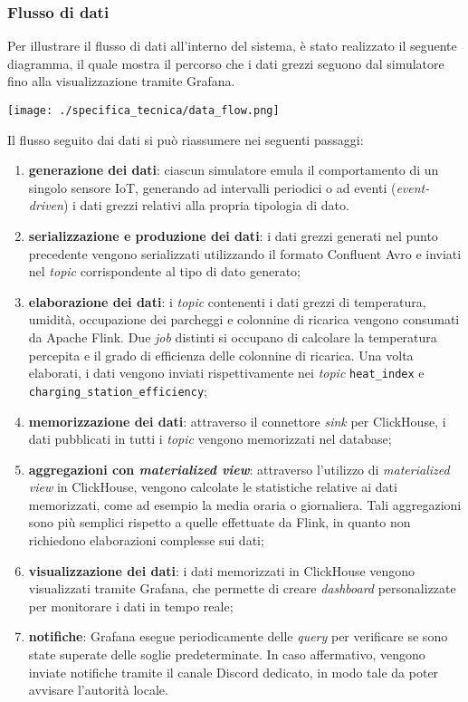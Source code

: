 \subsubsection{Flusso di dati}
Per illustrare il flusso di dati all'interno del sistema, è stato realizzato il seguente diagramma, il quale mostra il percorso che i dati grezzi seguono dal simulatore fino alla visualizzazione tramite Grafana.
\begin{center}
	\texttt{[image: ./specifica\_tecnica/data\_flow.png]}
\end{center}
Il flusso seguito dai dati si può riassumere nei seguenti passaggi:
\begin{enumerate}
	\item \textbf{generazione dei dati}: ciascun simulatore emula il comportamento di un singolo sensore IoT, generando ad intervalli periodici o ad eventi (\textit{event-driven}) i dati grezzi relativi alla propria tipologia di dato.
	\item \textbf{serializzazione e produzione dei dati}: i dati grezzi generati nel punto precedente vengono serializzati utilizzando il formato Confluent Avro e inviati nel \textit{topic} corrispondente al tipo di dato generato;
	\item \textbf{elaborazione dei dati}: i \textit{topic} contenenti i dati grezzi di temperatura, umidità, occupazione dei parcheggi e colonnine di ricarica vengono consumati da Apache Flink.
	      Due \textit{job} distinti si occupano di calcolare la temperatura percepita e il grado di efficienza delle colonnine di ricarica. Una volta elaborati, i dati vengono inviati rispettivamente
	      nei \textit{topic} \texttt{heat\_index} e \texttt{charging\_station\_efficiency};
	\item \textbf{memorizzazione dei dati}: attraverso il connettore \textit{sink} per ClickHouse, i dati pubblicati in tutti i \textit{topic} vengono memorizzati nel database;
	\item \textbf{aggregazioni con \textit{materialized view}}: attraverso l'utilizzo di \textit{materialized view} in ClickHouse, vengono calcolate le statistiche relative ai dati memorizzati, come ad esempio la media oraria o giornaliera.
	      Tali aggregazioni sono più semplici rispetto a quelle effettuate da Flink, in quanto non richiedono elaborazioni complesse sui dati;
	\item \textbf{visualizzazione dei dati}: i dati memorizzati in ClickHouse vengono visualizzati tramite Grafana, che permette di creare \textit{dashboard} personalizzate per monitorare i dati in tempo reale;
	\item \textbf{notifiche}: Grafana esegue periodicamente delle \textit{query} per verificare se sono state superate delle soglie predeterminate. In caso affermativo, vengono inviate notifiche tramite il canale Discord dedicato, in modo tale da poter avvisare l'autorità locale.
\end{enumerate}

